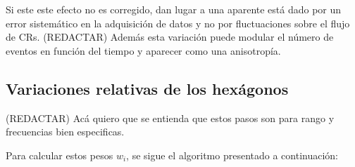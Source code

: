 Si este este efecto no es corregido, dan lugar a una aparente está dado por un error sistemático en la adquisición de datos y no por fluctuaciones sobre el flujo de CRs. (REDACTAR) Además esta variación puede modular el número de  eventos en función del tiempo y aparecer como una anisotropía.




  \subsection{Variaciones relativas de los hexágonos} \label{peso_hexagonos}

    (REDACTAR) Acá quiero que se entienda que estos pasos son para rango y frecuencias bien especificas.

    Para calcular estos pesos $w_i$, se sigue el algoritmo presentado a continuación:
     
